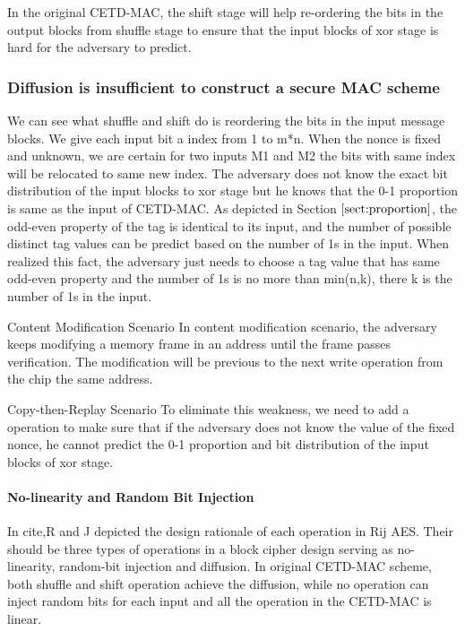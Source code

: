  In the original CETD-MAC, the shift stage will help re-ordering the bits in the output blocks from shuffle stage to ensure that the input blocks of xor stage is hard for the adversary to predict. 

\subsubsection{Diffusion is insufficient to construct a secure MAC scheme}\label{par:diffusion}
We can see what shuffle and shift do is reordering the bits in the input message
blocks. We give each input bit a index from 1 to m*n. When the nonce is fixed
and unknown, we are certain for two inputs M1 and M2 the bits with same index
will be relocated to same new index. The adversary does not know the exact bit
distribution of the input blocks to xor stage but he knows that the 0-1
proportion is same as the input of CETD-MAC. As depicted in Section $\ref{sect:proportion}$, the odd-even property of the tag is identical to its input, and the number of possible distinct tag values can be predict based on the number of 1s in the input. When realized this fact, the adversary just needs to choose a tag value that has same odd-even property and the number of 1s is no more than min(n,k), there k is the number of 1s in the input.

Content Modification Scenario
In content modification scenario, the adversary keeps modifying a memory frame in an address until the frame passes verification. The modification will be previous to the next write operation from the chip the same address. 

Copy-then-Replay Scenario
To eliminate this weakness, we need to add a operation to make sure that if the adversary does not know the value of the fixed nonce, he cannot predict the 0-1 proportion and bit distribution of the input blocks of xor stage. 
%
\paragraph{No-linearity and Random Bit Injection}
In cite{},R and J depicted the design rationale of each operation in Rij AES. Their should be three types of operations in a block cipher design serving as no-linearity, random-bit injection and diffusion.  
In original CETD-MAC scheme, both shuffle and shift operation achieve the diffusion, while no operation can inject random bits for each input and all the operation in the CETD-MAC is linear.  

